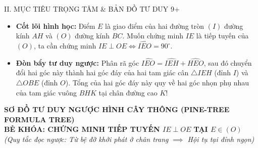 \documentclass[11pt,a4paper]{article}
\begin{document}
\begin{pedagogybox}{II. MỤC TIÊU TRỌNG TÂM \& BẢN ĐỒ TƯ DUY 9+}
\begin{itemize}[leftmargin=*, nosep]
    \item \textbf{Cốt lõi hình học:} Điểm $E$ là giao điểm của hai đường tròn $(I)$ đường kính $AH$ và $(O)$ đường kính $BC$. Muốn chứng minh $IE$ là tiếp tuyến của $(O)$, ta cần chứng minh $IE \perp OE \iff \widehat{IEO} = 90^\circ$.
    \item \textbf{Đòn bẩy tư duy ngược:} Phân rã góc $\widehat{IEO} = \widehat{IEH} + \widehat{HEO}$, sau đó chuyển đổi hai góc này thành hai góc đáy của hai tam giác cân $\triangle IEH$ (đỉnh $I$) và $\triangle OBE$ (đỉnh $O$). Tổng của hai góc đáy này quy về hai góc nhọn phụ nhau của tam giác vuông $BHK$ tại chân đường cao $K$!
\end{itemize}
\end{pedagogybox}

\newpage

\begin{center}
    {\Large\bfseries\color{blue!80!black} SƠ ĐỒ TƯ DUY NGƯỢC HÌNH CÂY THÔNG (PINE-TREE FORMULA TREE)}\\[1.5mm]
    {\large\bfseries BẺ KHÓA: CHỨNG MINH TIẾP TUYẾN $IE \perp OE$ TẠI $E \in (O)$}\\[1mm]
    \textit{(Quy tắc đọc ngược: Từ bệ đỡ khởi phát ở chân trang $\implies$ Hội tụ tại đỉnh ngọn)}
\end{center}

\vspace{1mm}
\end{document}
